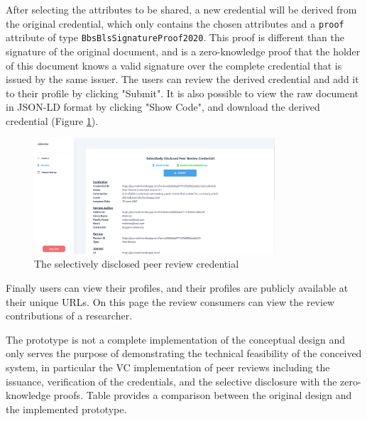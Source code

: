 After selecting the attributes to be shared, a new credential will be derived from the original credential, which only contains the chosen attributes and a \lstinline{proof} attribute of type \lstinline{BbsBlsSignatureProof2020}. This proof is different than the signature of the original document, and is a zero-knowledge proof that the holder of this document knows a valid signature over the complete credential that is issued by the same issuer. The users can review the derived credential and add it to their profile by clicking "Submit". It is also possible to view the raw document in \acrshort{JSON-LD} format by clicking "Show Code", and download the derived credential (Figure \ref{fig:derived-credential}).

\begin{figure}[htpb]
  \centering
  \includegraphics[width=0.8\textwidth]{figures/derived-credential.png}
  \caption{The selectively disclosed peer review credential} \label{fig:derived-credential}
\end{figure}

Finally users can view their profiles, and their profiles are publicly available at their unique \acrshort{URL}s. On this page the review consumers can view the review contributions of a researcher.

The prototype is not a complete implementation of the conceptual design and only serves the purpose of demonstrating the technical feasibility of the conceived system, in particular the \acrshort{VC} implementation of peer reviews including the issuance, verification of the credentials, and the selective disclosure with the zero-knowledge proofs. Table provides a comparison between the original design and the implemented prototype. 
